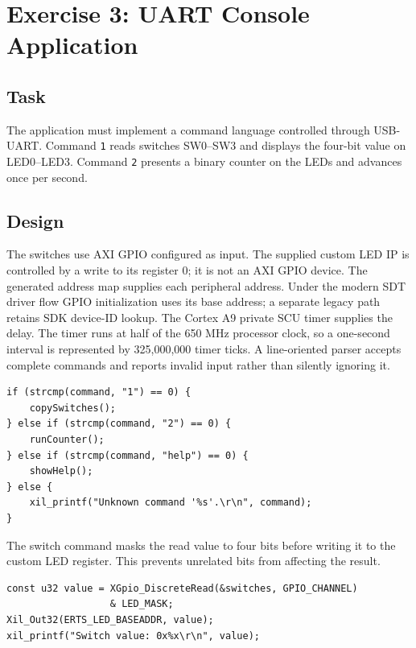 \documentclass[11pt,a4paper]{article}
\begin{document}
\clearpage
\tableofcontents
\clearpage

\section{Exercise 3: UART Console Application}

\subsection{Task}
The application must implement a command language controlled through USB-UART.
Command \texttt{1} reads switches SW0--SW3 and displays the four-bit value on
LED0--LED3. Command \texttt{2} presents a binary counter on the LEDs and advances
once per second.

\subsection{Design}
The switches use AXI GPIO configured as input. The supplied custom LED IP is
controlled by a write to its register 0; it is not an AXI GPIO device. The
generated address map supplies each peripheral address. Under the modern SDT
driver flow GPIO initialization uses its base address; a separate legacy path
retains SDK device-ID lookup. The Cortex A9 private SCU timer supplies the delay.
The timer runs at half of the 650 MHz processor clock, so a one-second interval is
represented by 325,000,000 timer ticks. A line-oriented parser accepts complete
commands and reports invalid input rather than silently ignoring it.

\begin{lstlisting}[style=cppstyle,caption={UART command dispatch}]
if (strcmp(command, "1") == 0) {
    copySwitches();
} else if (strcmp(command, "2") == 0) {
    runCounter();
} else if (strcmp(command, "help") == 0) {
    showHelp();
} else {
    xil_printf("Unknown command '%s'.\r\n", command);
}
\end{lstlisting}

The switch command masks the read value to four bits before writing it to the
custom LED register. This prevents unrelated bits from affecting the result.

\begin{lstlisting}[style=cppstyle,caption={Switch-to-LED transfer}]
const u32 value = XGpio_DiscreteRead(&switches, GPIO_CHANNEL)
                  & LED_MASK;
Xil_Out32(ERTS_LED_BASEADDR, value);
xil_printf("Switch value: 0x%x\r\n", value);
\end{lstlisting}
\end{document}
